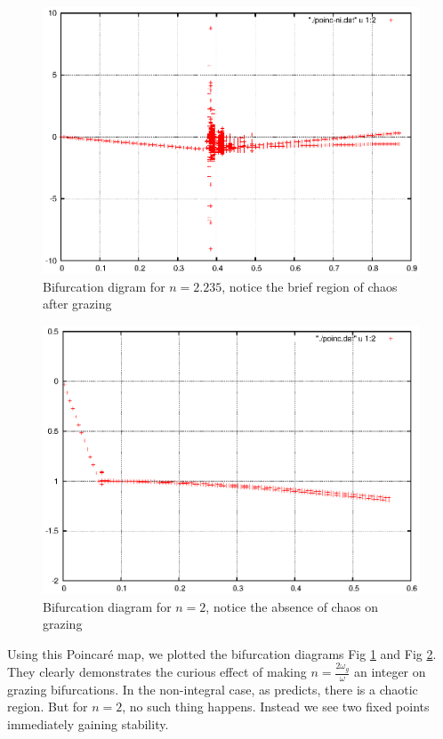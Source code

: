 \documentclass{book}
\renewcommand{\(}{\begin{columns}}
\renewcommand{\)}{\end{columns}}
\newcommand{\<}[1]{\begin{column}{#1}}
\renewcommand{\>}{\end{column}}
\begin{document}
\begin{figure}[!htp]
\begin{center}
\caption{Bifurcation digram for $n=2.235$, notice the brief region of chaos after grazing}
\label{fig-bif-int}
\includegraphics[width=0.6\columnwidth]{after-graz-non-int}
\end{center}
\end{figure}

\begin{figure}[!htb]
\begin{center}
\caption{Bifurcation diagram for $n=2$, notice the absence of chaos on grazing}
\label{fig-bif-nonint}
\includegraphics[width=0.6\columnwidth]{after-graz-int}
\end{center}
\end{figure}

Using this Poincaré map, we plotted the bifurcation diagrams  Fig 
\ref{fig-bif-int} and Fig \ref{fig-bif-nonint}. They clearly demonstrates the 
curious effect of making $n=\frac{2\omega_g}{\omega}$ 
an integer on grazing bifurcations. In the non-integral case, as 
\cite{banerjee-kundu-soft,banerjee-kundu-hard} predicts, there is a chaotic 
region.  But for $n=2$, no such thing happens.  Instead we see two fixed 
points immediately gaining stability. 
\end{document}
